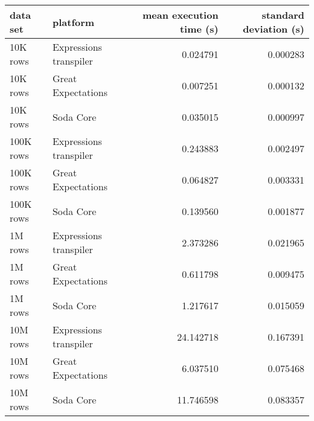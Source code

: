\begin{tabular}{llrr}
\toprule
data set & platform & mean execution time (s) & standard deviation (s) \\
\midrule
10K rows & Expressions transpiler & 0.024791 & 0.000283 \\
10K rows & Great Expectations & 0.007251 & 0.000132 \\
10K rows & Soda Core & 0.035015 & 0.000997 \\
100K rows & Expressions transpiler & 0.243883 & 0.002497 \\
100K rows & Great Expectations & 0.064827 & 0.003331 \\
100K rows & Soda Core & 0.139560 & 0.001877 \\
1M rows & Expressions transpiler & 2.373286 & 0.021965 \\
1M rows & Great Expectations & 0.611798 & 0.009475 \\
1M rows & Soda Core & 1.217617 & 0.015059 \\
10M rows & Expressions transpiler & 24.142718 & 0.167391 \\
10M rows & Great Expectations & 6.037510 & 0.075468 \\
10M rows & Soda Core & 11.746598 & 0.083357 \\
\bottomrule
\end{tabular}
